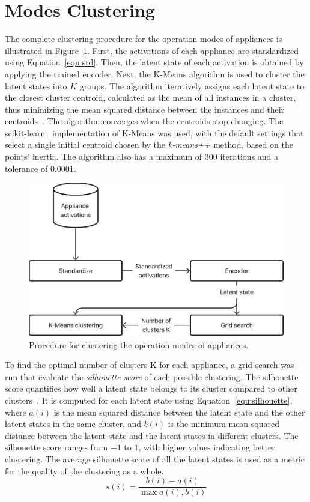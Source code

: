 \section{Modes Clustering}

The complete clustering procedure for the operation modes of appliances is illustrated in Figure~\ref{fig:clustering}. First, the activations of each appliance are standardized using Equation~\eqref{equ:std}. Then, the latent state of each activation is obtained by applying the trained encoder. Next, the K-Means algorithm is used to cluster the latent states into $K$ groups. The algorithm iteratively assigns each latent state to the closest cluster centroid, calculated as the mean of all instances in a cluster, thus minimizing the mean squared distance between the instances and their centroids~\parencite{lloyd_least_1982}. The algorithm converges when the centroids stop changing. The scikit-learn~\parencite*{pedregosa_scikit-learn_2011,buitinck_api_2013} implementation of K-Means was used, with the default settings that select a single initial centroid chosen by the \textit{k-means++} method, based on the points’ inertia. The algorithm also has a maximum of $300$ iterations and a tolerance of $0.0001$.

\begin{figure}
    \centering
    \includegraphics[width=.5\linewidth]{images/clustering.png}
    \caption{Procedure for clustering the operation modes of appliances.}
    \label{fig:clustering}
\end{figure}

To find the optimal number of clusters K for each appliance, a grid search was run that evaluate the \textit{silhouette score} of each possible clustering. The silhouette score quantifies how well a latent state belongs to its cluster compared to other clusters~\parencite{rousseeuw_silhouettes_1987}. It is computed for each latent state using Equation~\eqref{equ:silhouette}, where $a(i)$ is the mean squared distance between the latent state and the other latent states in the same cluster, and $b(i)$ is the minimum mean squared distance between the latent state and the latent states in different clusters. The silhouette score ranges from $-1$ to $1$, with higher values indicating better clustering. The average silhouette score of all the latent states is used as a metric for the quality of the clustering as a whole.
\begin{equation}\label{equ:silhouette}
s(i) = \frac{b(i) - a(i)}{\max{a(i), b(i)}}
\end{equation}

